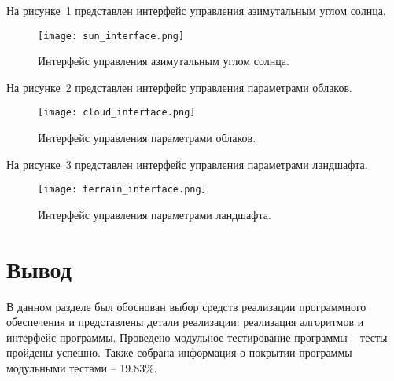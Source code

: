 На рисунке~\ref{fig:sun-interface} представлен интерфейс управления азимутальным углом солнца.
\begin{figure}[htb!]
	\centering
	\texttt{[image: sun\_interface.png]}
	\caption{Интерфейс управления азимутальным углом солнца.}
	\label{fig:sun-interface}
\end{figure}

На рисунке~\ref{fig:cloud-interface} представлен интерфейс управления параметрами облаков.
\begin{figure}[htb!]
	\centering
	\texttt{[image: cloud\_interface.png]}
	\caption{Интерфейс управления параметрами облаков.}
	\label{fig:cloud-interface}
\end{figure}
\clearpage
На рисунке~\ref{fig:terrain-interface} представлен интерфейс управления параметрами ландшафта.
\begin{figure}[htb!]
	\centering
	\texttt{[image: terrain\_interface.png]}
	\caption{Интерфейс управления параметрами ландшафта.}
	\label{fig:terrain-interface}
\end{figure}

\section*{Вывод}
В данном разделе был обоснован выбор средств реализации программного обеспечения и представлены детали реализации: реализация алгоритмов и интерфейс программы. Проведено модульное тестирование программы -- тесты пройдены успешно. Также собрана информация о покрытии программы модульными тестами -- 19.83\%.
